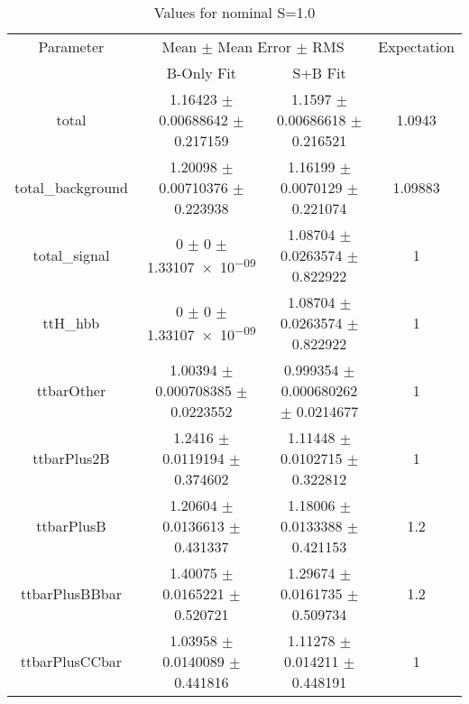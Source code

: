 \begin{table}
\centering
\caption{Values for nominal S=1.0}
\begin{tabular}{cccc}
\toprule
Parameter & \multicolumn{2}{c}{Mean $\pm$ Mean Error $\pm$ RMS} & Expectation\\
 & B-Only Fit & S+B Fit & \\
\midrule
total & \num{1.16423} $\pm$ \num{0.00688642} $\pm$ \num{0.217159} & \num{1.1597} $\pm$ \num{0.00686618} $\pm$ \num{0.216521} & \num{1.0943}\\
total\_background & \num{1.20098} $\pm$ \num{0.00710376} $\pm$ \num{0.223938} & \num{1.16199} $\pm$ \num{0.0070129} $\pm$ \num{0.221074} & \num{1.09883}\\
total\_signal & \num{0} $\pm$ \num{0} $\pm$ \num{1.33107e-09} & \num{1.08704} $\pm$ \num{0.0263574} $\pm$ \num{0.822922} & \num{1}\\
ttH\_hbb & \num{0} $\pm$ \num{0} $\pm$ \num{1.33107e-09} & \num{1.08704} $\pm$ \num{0.0263574} $\pm$ \num{0.822922} & \num{1}\\
ttbarOther & \num{1.00394} $\pm$ \num{0.000708385} $\pm$ \num{0.0223552} & \num{0.999354} $\pm$ \num{0.000680262} $\pm$ \num{0.0214677} & \num{1}\\
ttbarPlus2B & \num{1.2416} $\pm$ \num{0.0119194} $\pm$ \num{0.374602} & \num{1.11448} $\pm$ \num{0.0102715} $\pm$ \num{0.322812} & \num{1}\\
ttbarPlusB & \num{1.20604} $\pm$ \num{0.0136613} $\pm$ \num{0.431337} & \num{1.18006} $\pm$ \num{0.0133388} $\pm$ \num{0.421153} & \num{1.2}\\
ttbarPlusBBbar & \num{1.40075} $\pm$ \num{0.0165221} $\pm$ \num{0.520721} & \num{1.29674} $\pm$ \num{0.0161735} $\pm$ \num{0.509734} & \num{1.2}\\
ttbarPlusCCbar & \num{1.03958} $\pm$ \num{0.0140089} $\pm$ \num{0.441816} & \num{1.11278} $\pm$ \num{0.014211} $\pm$ \num{0.448191} & \num{1}\\
\bottomrule
\end{tabular}
\end{table}